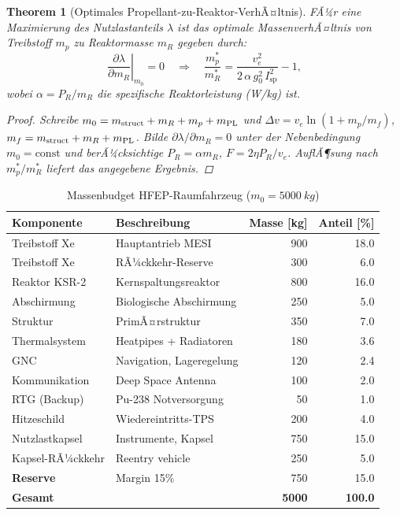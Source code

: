 ﻿\documentclass[a4paper,12pt,twoside]{article}
\theoremstyle{plain}
\newtheorem{theorem}{Theorem}[section]
\theoremstyle{definition}
\theoremstyle{remark}
\newcommand{\Isp}{I_{\mathrm{sp}}}
\newcommand{\ve}{v_e}
\newcommand{\Dv}{\Delta v}
\newcommand{\mzero}{m_0}
\newcommand{\gzero}{g_0}
\begin{document}
	\begin{theorem}[Optimales Propellant-zu-Reaktor-VerhÃ¤ltnis]
		\label{thm:opt_mass}
		FÃ¼r eine Maximierung des Nutzlastanteils $\lambda$ ist das optimale
		MassenverhÃ¤ltnis von Treibstoff $m_p$ zu Reaktormasse $m_R$ gegeben durch:
		\begin{equation}
			\left.\frac{\partial\lambda}{\partial m_R}\right|_{m_0} = 0
			\quad\Longrightarrow\quad
			\frac{m_p^*}{m_R^*} = \frac{\ve^2}{2\,\alpha\,\gzero^2\,\Isp^2} - 1,
		\end{equation}
		wobei $\alpha = P_R / m_R$ die spezifische Reaktorleistung (W/kg) ist.
		\begin{proof}
			Schreibe $m_0 = m_{\rm struct} + m_R + m_p + m_{\rm PL}$ und
			$\Dv = \ve\ln(1 + m_p/m_f)$, $m_f = m_{\rm struct} + m_R + m_{\rm PL}$.
			Bilde $\partial\lambda/\partial m_R = 0$ unter der Nebenbedingung
			$m_0 = \text{const}$ und berÃ¼cksichtige $P_R = \alpha m_R$,
			$F = 2\eta P_R/\ve$. AuflÃ¶sung nach $m_p^*/m_R^*$ liefert das angegebene Ergebnis.
			\qedhere
		\end{proof}
	\end{theorem}
	
	\begin{table}[h]
		\centering
		\caption{Massenbudget HFEP-Raumfahrzeug ($\mzero = \SI{5000}{kg}$)}
		\label{tab:mass_budget}
		\renewcommand{\arraystretch}{1.3}
		\begin{tabular}{llrr}
			\toprule
			\textbf{Komponente} & \textbf{Beschreibung} & \textbf{Masse [kg]} & \textbf{Anteil [\%]}\\
			\midrule
			Treibstoff Xe  & Hauptantrieb MESI      & 900  & 18.0 \\
			Treibstoff Xe  & RÃ¼ckkehr-Reserve       & 300  & 6.0  \\
			Reaktor KSR-2  & Kernspaltungsreaktor   & 800  & 16.0 \\
			Abschirmung    & Biologische Abschirmung & 250 & 5.0  \\
			Struktur       & PrimÃ¤rstruktur         & 350  & 7.0  \\
			Thermalsystem  & Heatpipes + Radiatoren & 180  & 3.6  \\
			GNC            & Navigation, Lageregelung& 120 & 2.4  \\
			Kommunikation  & Deep Space Antenna     & 100  & 2.0  \\
			RTG (Backup)   & Pu-238 Notversorgung   & 50   & 1.0  \\
			Hitzeschild    & Wiedereintritts-TPS    & 200  & 4.0  \\
			Nutzlastkapsel & Instrumente, Kapsel    & 750  & 15.0 \\
			Kapsel-RÃ¼ckkehr& Reentry vehicle        & 250  & 5.0  \\
			\textbf{Reserve}& Margin 15\%           & 750  & 15.0 \\
			\midrule
			\textbf{Gesamt} &                       & \textbf{5000} & \textbf{100.0}\\
			\bottomrule
		\end{tabular}
	\end{table}
	
\end{document}
